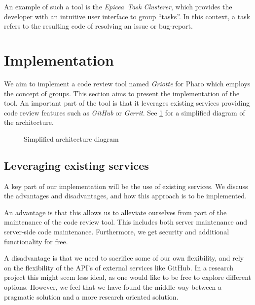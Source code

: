 \documentclass[conference,a4paper]{IEEEtran}
\newcommand{\Ep}{Epicea}
\newcommand{\Gr}{Griotte}
\begin{document}
An example of such a tool is the \textit{\Ep\ Task
  Clusterer}\cite{Dias15a}, which provides the developer with an
intuitive user interface to group ``tasks''. In this context, a task
refers to the resulting code of resolving an issue or bug-report.

\section{Implementation}
\label{sec:implementation}
We aim to implement a code review tool named \textit{\Gr} for Pharo
which employs the concept of groups. This section aims to present the
implementation of the tool. An important part of the tool is that it
leverages existing services providing code review features such as
\textit{GitHub} or \textit{Gerrit}. See \cref{fig:diagram} for a
simplified diagram of the architecture.
\begin{figure}[t]
  \caption{Simplified architecture diagram}
  \label{fig:diagram}
\end{figure}

\subsection{Leveraging existing services}
\label{sec:lever-exist-serv}
A key part of our implementation will be the use of existing
services. We discuss the advantages and disadvantages, and how this
approach is to be implemented.

An advantage is that this allows us to alleviate ourselves from part
of the maintenance of the code review tool. This includes both server
maintenance and server-side code maintenance. Furthermore, we get
security and additional functionality for free.

A disadvantage is that we need to sacrifice some of our own
flexibility, and rely on the flexibility of the API's of external
services like GitHub. In a research project this might seem less
ideal, as one would like to be free to explore different
options. However, we feel that we have found the middle way between a
pragmatic solution and a more research oriented solution.
\end{document}
